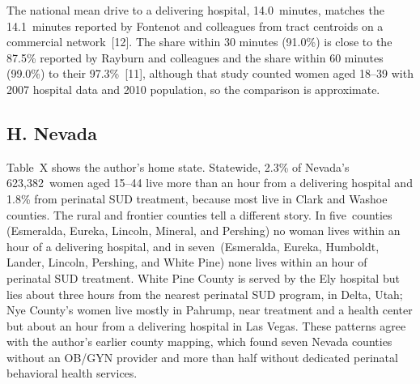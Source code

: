 \documentclass{article}
\begin{document}
The national mean drive to a delivering hospital, 14.0\ minutes, matches the 14.1\ minutes reported by Fontenot and colleagues from tract centroids on a commercial network~[12]. The share within 30 minutes (91.0\%) is close to the 87.5\% reported by Rayburn and colleagues and the share within 60 minutes (99.0\%) to their 97.3\%~[11], although that study counted women aged 18--39 with 2007 hospital data and 2010 population, so the comparison is approximate.

\subsection*{H. Nevada}
Table~X shows the author's home state. Statewide, 2.3\% of Nevada's 623,382\ women aged 15--44 live more than an hour from a delivering hospital and 1.8\% from perinatal SUD treatment, because most live in Clark and Washoe counties. The rural and frontier counties tell a different story. In five\ counties (Esmeralda, Eureka, Lincoln, Mineral, and Pershing) no woman lives within an hour of a delivering hospital, and in seven\ (Esmeralda, Eureka, Humboldt, Lander, Lincoln, Pershing, and White Pine) none lives within an hour of perinatal SUD treatment. White Pine County is served by the Ely hospital but lies about three hours from the nearest perinatal SUD program, in Delta, Utah; Nye County's women live mostly in Pahrump, near treatment and a health center but about an hour from a delivering hospital in Las Vegas. These patterns agree with the author's earlier county mapping, which found seven Nevada counties without an OB/GYN provider and more than half without dedicated perinatal behavioral health services.
\end{document}
